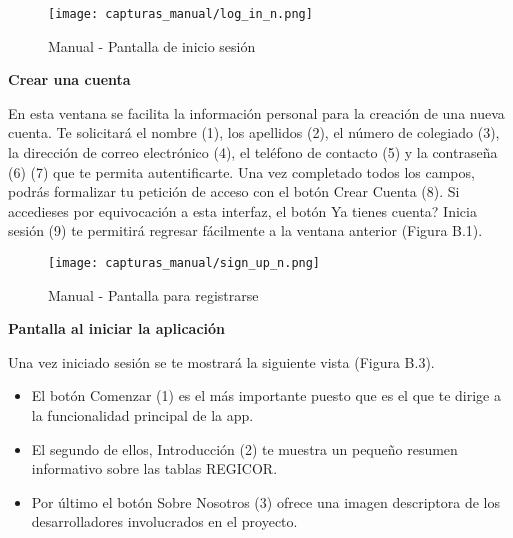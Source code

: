 \documentclass[11pt,spanish,
		listoftables,listoffigures]
		{tfgplantilla}
\begin{document}
\begin{figure}[H]
\centering
\texttt{[image: capturas\_manual/log\_in\_n.png]}
\caption{Manual - Pantalla de inicio sesión}	
\end{figure}

\textbf {Crear una cuenta}

En esta ventana se facilita la información personal para la creación de una nueva cuenta. Te solicitará el nombre (1), los apellidos (2), el número de colegiado (3), la dirección de correo electrónico (4), el teléfono de contacto (5) y la contraseña (6) (7) que te permita autentificarte. Una vez completado todos los campos, podrás formalizar tu petición de acceso con el botón \textquotedbl Crear Cuenta\textquotedbl{} (8). Si accedieses por equivocación a esta interfaz, el botón \textquotedbl Ya tienes cuenta? Inicia sesión\textquotedbl{} (9) te permitirá regresar fácilmente a la ventana anterior (Figura B.1).


\begin{figure}[H]
\centering
\texttt{[image: capturas\_manual/sign\_up\_n.png]}
\caption{Manual - Pantalla para registrarse}
\end{figure}

\textbf {Pantalla al iniciar la aplicación}

Una vez iniciado sesión se te mostrará la siguiente vista (Figura B.3). 

\begin{itemize}
	\item El botón \textquotedbl Comenzar\textquotedbl{} (1) es el más importante puesto que es el que te dirige a la funcionalidad principal de la app.

	\item El segundo de ellos, \textquotedbl Introducción\textquotedbl{} (2) te muestra un pequeño resumen informativo sobre las tablas REGICOR.

	\item Por último el botón \textquotedbl Sobre Nosotros\textquotedbl{} (3) ofrece una imagen descriptora de los desarrolladores involucrados en el proyecto.
\end{itemize}
\end{document}
